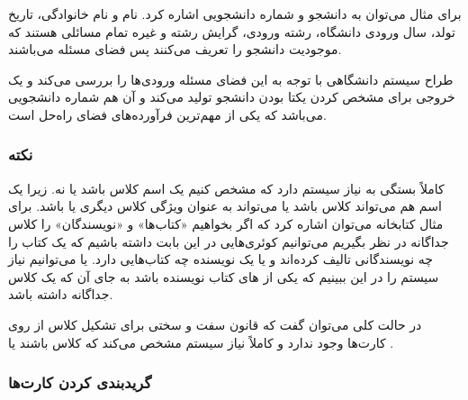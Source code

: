 برای مثال می‌توان به دانشجو و شماره دانشجویی اشاره کرد. نام و نام خانوادگی،
تاریخ تولد، سال ورودی دانشگاه، رشته ورودی، گرایش رشته و غیره تمام مسائلی هستند
که موجودیت دانشجو را تعریف می‌کنند پس فضای مسئله می‌باشند.

طراح سیستم دانشگاهی با توجه به این فضای‌ مسئله ورودی‌ها را بررسی می‌کند و یک
خروجی برای مشخص کردن یکتا بودن دانشجو تولید می‌کند و آن هم شماره دانشجویی
می‌باشد که یکی از مهم‌ترین فرآورده‌های فضای راه‌حل است.

\subsubsection*{نکته}

کاملاً بستگی به نیاز سیستم دارد که مشخص کنیم یک اسم کلاس باشد یا نه. زیرا یک اسم
هم می‌تواند کلاس باشد یا می‌تواند به عنوان ویژگی کلاس دیگری یا 
باشد. برای مثال کتابخانه می‌توان اشاره کرد که اگر بخواهیم «کتاب‌ها» و
«نویسندگان» را کلاس جداگانه در نظر بگیریم می‌توانیم کوئری‌هایی در این بابت داشته
باشیم که یک کتاب را چه نویسندگانی تالیف کرده‌اند و یا یک نویسنده چه کتاب‌هایی
دارد. یا می‌توانیم نیاز سیستم را در این ببینیم که یکی از های کتاب
نویسنده باشد به جای آن که یک کلاس جداگانه داشته باشد.

در حالت کلی می‌توان گفت که قانون سفت و سختی برای تشکیل کلاس از روی کارت‌ها وجود
ندارد و کاملاً نیاز سیستم مشخص می‌کند که کلاس باشند یا .

\subsubsection*{گریدبندی کردن کارت‌‌ها}







